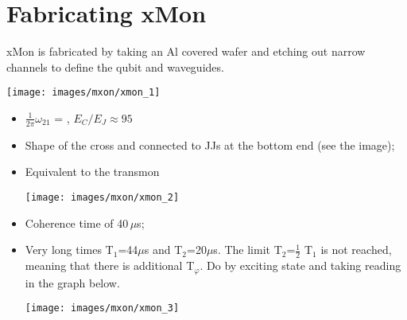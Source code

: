 \newpage
\section{Fabricating xMon \cite{Barends_2013}}
\label{sec:making-transmon}

\begin{framed}\noindent
  \ec
  
  xMon is fabricated by  taking an Al covered wafer and etching out  narrow channels to define
  the qubit  and waveguides.   \ec

  \begin{center}
    \texttt{[image: images/mxon/xmon\_1]}
  \end{center}

  \begin{itemize}
  \item $\frac{1}{2\pi}\omega_{21}$ = , $ E_{C}/E_J \approx 95 $
  \item Shape of the cross and connected to JJs at the bottom end (see the image);
  \item  Equivalent  to   the  transmon  \ec
    \begin{center}
      \texttt{[image: images/mxon/xmon\_2]}
    \end{center}
    \noindent
  \item Coherence time of 40\,$\mu$s;
  \item Very long times T$_1$=44$\mu$s and  T$_2$=20$\mu$s. The limit T$_2$=$\frac{1}{2}$ T$_1$ is
    not reached,  meaning that there  is additional T$_{\varphi}$. Do  by exciting state  and taking
    reading in the graph below.

  \begin{center}
    \texttt{[image: images/mxon/xmon\_3]}
  \end{center}

  \noindent
\end{itemize}


\end{framed}
